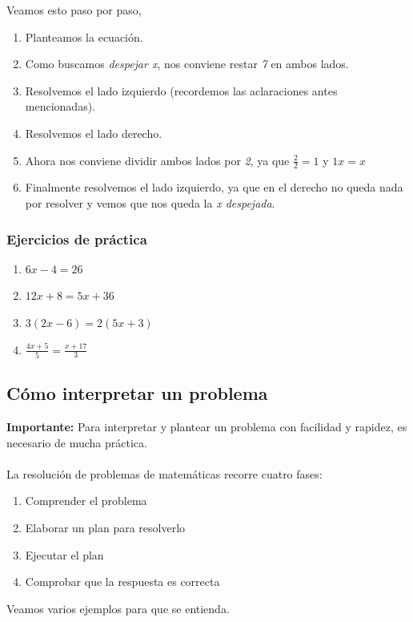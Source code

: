 \documentclass{article}
\begin{document}
\begin{normalsize}
Veamos esto paso por paso,
\begin{enumerate}
	\item Planteamos la ecuación.
	\item Como buscamos \textit{despejar x}, nos conviene restar \textit{7} en ambos lados.
	\item Resolvemos el lado izquierdo (recordemos las aclaraciones antes mencionadas).
	\item Resolvemos el lado derecho.
	\item Ahora nos conviene dividir ambos lados por \textit{2}, ya que $\frac{2}{2}=1$ y $1x=x$
	\item Finalmente resolvemos el lado izquierdo, ya que en el derecho no queda nada por resolver y vemos que nos queda la \textit{x despejada}.
\end{enumerate}
\end{normalsize}

\subsubsection*{Ejercicios de práctica}
\begin{normalsize}
\begin{enumerate}
	\item $6x-4=26$
	\item $12x+8=5x+36$
	\item $3(2x-6)=2(5x+3)$
	\item $\frac{4x+5}{5}=\frac{x+17}{3}$
\end{enumerate}
\end{normalsize}

\subsection{Cómo interpretar un problema}
\begin{normalsize}
\textbf{Importante:} Para interpretar y plantear un problema con facilidad y rapidez, es necesario de mucha práctica.\\\\
La resolución de problemas de matemáticas recorre cuatro fases:
\begin{enumerate}
	\item Comprender el problema
	\item Elaborar un plan para resolverlo
	\item Ejecutar el plan
	\item Comprobar que la respuesta es correcta
\end{enumerate}

Veamos varios ejemplos para que se entienda.
\\
\end{normalsize}
\end{document}

